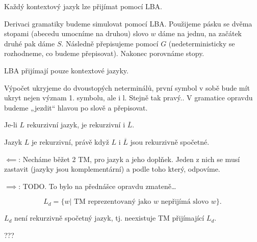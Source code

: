\documentclass[12pt]{article}                   %
\begin{document}
        \begin{veta}
            Každý kontextový jazyk lze přijímat pomocí LBA.

            \begin{dukazin}
                Derivaci gramatiky budeme simulovat pomocí LBA. Použijeme pásku se dvěma stopami (abecedu umocníme na druhou) slovo $w$ dáme na jednu, na začátek druhé pak dáme $S$. Následně přepisujeme pomocí $G$ (nedeterministicky se rozhodneme, co budeme přepisovat). Nakonec porovnáme stopy.
            \end{dukazin}
        \end{veta}

        \begin{veta}
            LBA přijímají pouze kontextové jazyky.

            \begin{dukazin}
                Výpočet ukryjeme do dvoustopých neterminálů, první symbol v sobě bude mít ukryt nejen význam 1. symbolu, ale i l. Stejně tak pravý.. V gramatice opravdu budeme „jezdit“ hlavou po slově a přepisovat.
            \end{dukazin}
        \end{veta}

        \begin{lemma}
            Je-li $L$ rekurzivní jazyk, je rekurzivní i $\overline{L}$.
        \end{lemma}

        \begin{veta}
            Jazyk $L$ je rekurzivní, právě když $L$ i $\overline{L}$ jsou rekurzivně spočetné.

            \begin{dukazin}
                $\impliedby$: Necháme běžet 2 TM, pro jazyk a jeho doplňek. Jeden z nich se musí zastavit (jazyky jsou komplementární) a podle toho který, odpovíme.

                $\implies$: TODO. To bylo na přednášce opravdu zmateně…
            \end{dukazin}
        \end{veta}

        \begin{definice}
            $$ L_d = \{w | \text{ TM reprezentovaný jako $w$ nepřijímá slovo $w$}\}. $$
        \end{definice}

        \begin{veta}
            $L_d$ není rekurzivně spočetný jazyk, tj. neexistuje TM přijímající $L_d$.

            \begin{dukazin}
                ???
            \end{dukazin}
        \end{veta}
\end{document}
